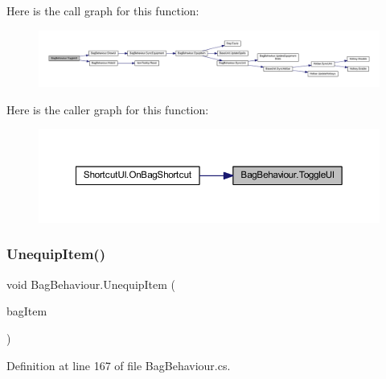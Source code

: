 Here is the call graph for this function\+:
\nopagebreak
\begin{figure}[H]
\begin{center}
\leavevmode
\includegraphics[width=350pt]{class_bag_behaviour_a830725c05ecdc1a1a637d26cf5cff0dc_cgraph}
\end{center}
\end{figure}
Here is the caller graph for this function\+:
\nopagebreak
\begin{figure}[H]
\begin{center}
\leavevmode
\includegraphics[width=350pt]{class_bag_behaviour_a830725c05ecdc1a1a637d26cf5cff0dc_icgraph}
\end{center}
\end{figure}
\mbox{\label{class_bag_behaviour_a61062b91187139c43e2681c220111433}} 
\subsubsection{\texorpdfstring{UnequipItem()}{UnequipItem()}}
{\footnotesize\ttfamily void Bag\+Behaviour.\+Unequip\+Item (\begin{DoxyParamCaption}\item[{\mbox{\hyperlink{class_bag_item_behaviour}{Bag\+Item\+Behaviour}}}]{bag\+Item }\end{DoxyParamCaption})}



Definition at line 167 of file Bag\+Behaviour.\+cs.

